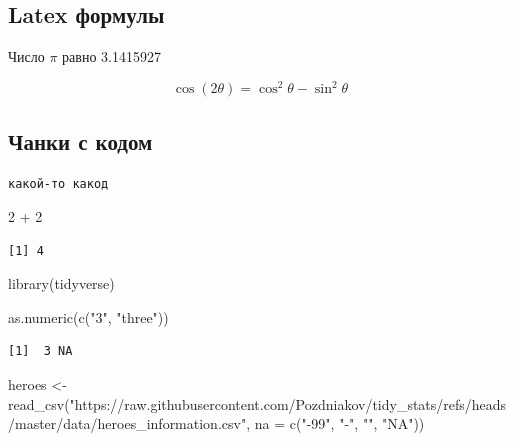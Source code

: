 \documentclass[
  letterpaper,
  DIV=11,
  numbers=noendperiod]{scrartcl}
\newenvironment{Shaded}{\begin{snugshade}}{\end{snugshade}}
\newcommand{\AttributeTok}[1]{\textcolor[rgb]{0.40,0.45,0.13}{#1}}
\newcommand{\DecValTok}[1]{\textcolor[rgb]{0.68,0.00,0.00}{#1}}
\newcommand{\FunctionTok}[1]{\textcolor[rgb]{0.28,0.35,0.67}{#1}}
\newcommand{\NormalTok}[1]{\textcolor[rgb]{0.00,0.23,0.31}{#1}}
\newcommand{\OtherTok}[1]{\textcolor[rgb]{0.00,0.23,0.31}{#1}}
\newcommand{\SpecialCharTok}[1]{\textcolor[rgb]{0.37,0.37,0.37}{#1}}
\newcommand{\StringTok}[1]{\textcolor[rgb]{0.13,0.47,0.30}{#1}}
\begin{document}
\hypertarget{latex-ux444ux43eux440ux43cux443ux43bux44b}{%
\subsection{Latex
формулы}\label{latex-ux444ux43eux440ux43cux443ux43bux44b}}

Число \(\pi\) равно 3.1415927

\[\cos (2\theta) = \cos^2 \theta - \sin^2 \theta \]

\hypertarget{ux447ux430ux43dux43aux438-ux441-ux43aux43eux434ux43eux43c}{%
\subsection{Чанки с
кодом}\label{ux447ux430ux43dux43aux438-ux441-ux43aux43eux434ux43eux43c}}

\begin{verbatim}
какой-то какод
\end{verbatim}

\begin{Shaded}
\begin{Highlighting}[]
\DecValTok{2} \SpecialCharTok{+} \DecValTok{2}
\end{Highlighting}
\end{Shaded}

\begin{verbatim}
[1] 4
\end{verbatim}

\begin{Shaded}
\begin{Highlighting}[]
\FunctionTok{library}\NormalTok{(tidyverse)}
\end{Highlighting}
\end{Shaded}

\begin{Shaded}
\begin{Highlighting}[]
\FunctionTok{as.numeric}\NormalTok{(}\FunctionTok{c}\NormalTok{(}\StringTok{"3"}\NormalTok{, }\StringTok{"three"}\NormalTok{))}
\end{Highlighting}
\end{Shaded}

\begin{verbatim}
[1]  3 NA
\end{verbatim}

\begin{Shaded}
\begin{Highlighting}[]
\NormalTok{heroes }\OtherTok{\textless{}{-}} \FunctionTok{read\_csv}\NormalTok{(}\StringTok{"https://raw.githubusercontent.com/Pozdniakov/tidy\_stats/refs/heads/master/data/heroes\_information.csv"}\NormalTok{,}
                   \AttributeTok{na =} \FunctionTok{c}\NormalTok{(}\StringTok{"{-}99"}\NormalTok{, }\StringTok{"{-}"}\NormalTok{, }\StringTok{""}\NormalTok{, }\StringTok{"NA"}\NormalTok{))}
\end{Highlighting}
\end{Shaded}
\end{document}
